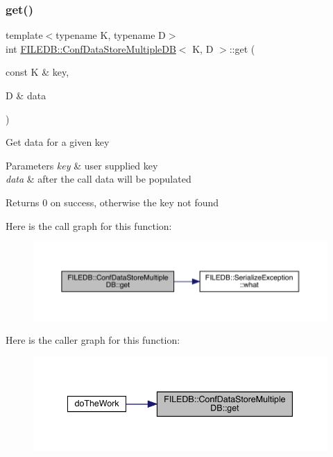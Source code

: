 \subsubsection{\texorpdfstring{get()}{get()}\hspace{0.1cm}{\footnotesize\ttfamily [2/3]}}
{\footnotesize\ttfamily template$<$typename K, typename D$>$ \\
int \mbox{\hyperlink{classFILEDB_1_1ConfDataStoreMultipleDB}{F\+I\+L\+E\+D\+B\+::\+Conf\+Data\+Store\+Multiple\+DB}}$<$ K, D $>$\+::get (\begin{DoxyParamCaption}\item[{const K \&}]{key,  }\item[{D \&}]{data }\end{DoxyParamCaption})\hspace{0.3cm}{\ttfamily [inline]}}

Get data for a given key 
\begin{DoxyParams}{Parameters}
{\em key} & user supplied key \\
\hline
{\em data} & after the call data will be populated \\
\hline
\end{DoxyParams}
\begin{DoxyReturn}{Returns}
0 on success, otherwise the key not found 
\end{DoxyReturn}
Here is the call graph for this function\+:
\nopagebreak
\begin{figure}[H]
\begin{center}
\leavevmode
\includegraphics[width=350pt]{d3/dc0/classFILEDB_1_1ConfDataStoreMultipleDB_a15c985c05120d6076e890f0507ceade7_cgraph}
\end{center}
\end{figure}
Here is the caller graph for this function\+:
\nopagebreak
\begin{figure}[H]
\begin{center}
\leavevmode
\includegraphics[width=341pt]{d3/dc0/classFILEDB_1_1ConfDataStoreMultipleDB_a15c985c05120d6076e890f0507ceade7_icgraph}
\end{center}
\end{figure}
\mbox{\label{classFILEDB_1_1ConfDataStoreMultipleDB_a15c985c05120d6076e890f0507ceade7}} 
